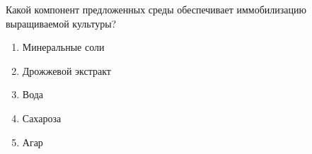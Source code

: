 
Какой компонент предложенных среды обеспечивает иммобилизацию выращиваемой культуры?

\begin{enumerate}
    \item Минеральные соли
    \item Дрожжевой экстракт
    \item Вода
    \item Сахароза
    \item Агар
\end{enumerate}